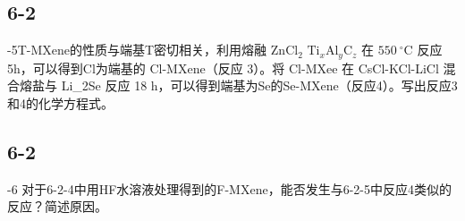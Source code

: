 \subsection*{6-2}
-5T-MXene的性质与端基T密切相关，利⽤熔融 $\mathrm { Z n C l _ { 2 } }$ $\mathrm { T i } _ { x } \mathrm { A l } _ { y } \mathrm { C } _ { z }$ 在 $5 5 0 ~ ^ { \circ } \mathrm { C }$ 反应5h，可以得到Cl为端基的 Cl-MXene（反应 3）。将 Cl-MXee 在 CsCl-KCl-LiCl 混合熔盐与 Li_{2}Se 反应 18 h，可以得到端基为Se的Se-MXene（反应4）。写出反应3和4的化学⽅程式。

\subsection*{6-2}
-6 对于6-2-4中⽤HF⽔溶液处理得到的F-MXene，能否发⽣与6-2-5中反应4类似的反应？简述原因。
